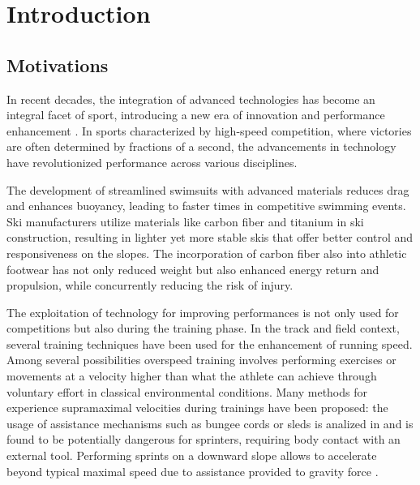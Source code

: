 \documentclass[a4paper,12pt,oneside]{book}
\begin{document}

\chapter*{Introduction}
	
\section*{Motivations}

In recent decades, the integration of advanced technologies has become an integral facet of sport, introducing a new era of innovation and performance enhancement \cite{Technology_athletics}. 
In sports characterized by high-speed competition, where victories are often determined by fractions of a second, the advancements in technology have revolutionized performance across various disciplines. 
\bigskip

The development of streamlined swimsuits with advanced materials reduces drag and enhances buoyancy, leading to faster times in competitive swimming events.
Ski manufacturers utilize materials like carbon fiber and titanium in ski construction, resulting in lighter yet more stable skis that offer better control and responsiveness on the slopes.
The incorporation of carbon fiber also into athletic footwear has not only reduced weight but also enhanced energy return and propulsion, while concurrently reducing the risk of injury.
\bigskip

The exploitation of technology for improving performances is not only used for competitions but also during the training phase. 
In the track and field context, several training techniques have been used for the enhancement of running speed. 
Among several possibilities overspeed training involves performing exercises or movements at a velocity higher than what the athlete can achieve through voluntary effort in classical environmental conditions. 
Many methods for experience supramaximal velocities during trainings have been proposed: the usage of assistance mechanisms such as bungee cords or sleds is analized in \cite{Elastic_cord} and is found to be potentially dangerous for sprinters, requiring body contact with an external tool.
Performing sprints on a downward slope allows to accelerate beyond typical maximal speed due to assistance provided to gravity force \cite{Hill_slope}.
\bigskip
\end{document}
